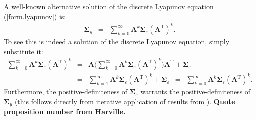 \documentclass[a4paper]{article}
\theoremstyle{myexamplestyle}
\def\reminder#1{\marginpar{\rule[0pt]{1mm}{11pt}}\textbf{#1}}
\begin{document}
\\
\\
A well-known alternative solution of the discrete Lyapunov equation (\ref{form.lyapunov}) is:
\begin{eqnarray*}
\mathbf{\Sigma}_{y} & = & \sum_{k=0}^{\infty} \mathbf{A}^k \mathbf{\Sigma}_{\varepsilon} (\mathbf{A}^{\mathrm{T}})^k.
\end{eqnarray*}
To see this is indeed a solution of the discrete Lyapunov equation, simply substitute it:
\begin{eqnarray*}
\sum_{k=0}^{\infty} \mathbf{A}^k \mathbf{\Sigma}_{\varepsilon} (\mathbf{A}^{\mathrm{T}})^k & = & \mathbf{A} \Big( \sum_{k=0}^{\infty} \mathbf{A}^k \mathbf{\Sigma}_{\varepsilon} (\mathbf{A}^{\mathrm{T}})^k \Big) \mathbf{A}^{\mathrm{T}} + \mathbf{\Sigma}_{\varepsilon}
\\
& = & \sum_{k=1}^{\infty} \mathbf{A}^k \mathbf{\Sigma}_{\varepsilon} (\mathbf{A}^{\mathrm{T}})^k + \mathbf{\Sigma}_{\varepsilon} \, \, \, =
\, \, \, \sum_{k=0}^{\infty} \mathbf{A}^k \mathbf{\Sigma}_{\varepsilon} (\mathbf{A}^{\mathrm{T}})^k.
\end{eqnarray*}
Furthermore, the positive-definiteness of $\mathbf{\Sigma}_{\varepsilon}$ warrants the positive-definiteness of $\mathbf{\Sigma}_{y}$ (this follows directly from iterative application of results from \citealt{Har2008}). \reminder{Quote proposition number from Harville.}
\end{document}
